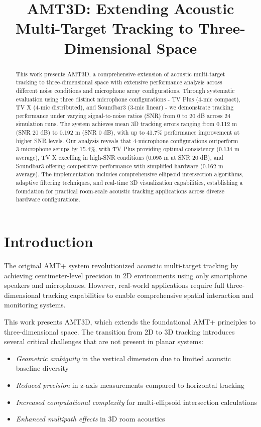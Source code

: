 \documentclass[a4paper]{article}
\title{AMT3D: Extending Acoustic Multi-Target Tracking to Three-Dimensional Space}
\begin{document}
\maketitle

\begin{abstract}
{\ninept This work presents AMT3D, a comprehensive extension of acoustic multi-target tracking to three-dimensional space with extensive performance analysis across different noise conditions and microphone array configurations. Through systematic evaluation using three distinct microphone configurations - TV Plus (4-mic compact), TV X (4-mic distributed), and Soundbar3 (3-mic linear) - we demonstrate tracking performance under varying signal-to-noise ratios (SNR) from 0 to 20 dB across 24 simulation runs. The system achieves mean 3D tracking errors ranging from 0.112 m (SNR 20 dB) to 0.192 m (SNR 0 dB), with up to 41.7\% performance improvement at higher SNR levels. Our analysis reveals that 4-microphone configurations outperform 3-microphone setups by 15.4\%, with TV Plus providing optimal consistency (0.134 m average), TV X excelling in high-SNR conditions (0.095 m at SNR 20 dB), and Soundbar3 offering competitive performance with simplified hardware (0.162 m average). The implementation includes comprehensive ellipsoid intersection algorithms, adaptive filtering techniques, and real-time 3D visualization capabilities, establishing a foundation for practical room-scale acoustic tracking applications across diverse hardware configurations.}
\end{abstract}

\section{Introduction}

The original AMT+ system \cite{amt_plus} revolutionized acoustic multi-target tracking by achieving centimeter-level precision in 2D environments using only smartphone speakers and microphones. However, real-world applications require full three-dimensional tracking capabilities to enable comprehensive spatial interaction and monitoring systems.

This work presents AMT3D, which extends the foundational AMT+ principles to three-dimensional space. The transition from 2D to 3D tracking introduces several critical challenges that are not present in planar systems:

\begin{itemize}
\item {\em Geometric ambiguity} in the vertical dimension due to limited acoustic baseline diversity
\item {\em Reduced precision} in z-axis measurements compared to horizontal tracking
\item {\em Increased computational complexity} for multi-ellipsoid intersection calculations
\item {\em Enhanced multipath effects} in 3D room acoustics
\end{itemize}
\end{document}
